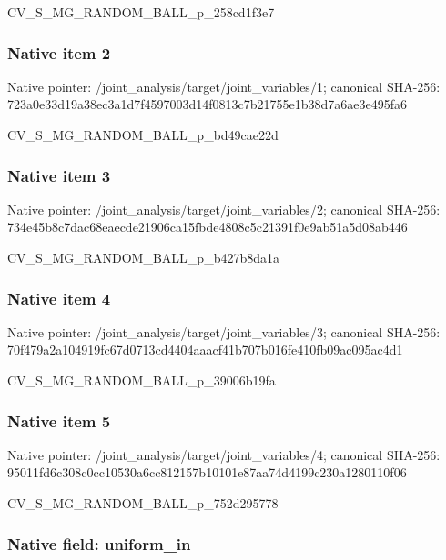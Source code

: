 \documentclass[10pt,a4paper]{article}
\begin{document}
CV\_S\_MG\_RANDOM\_BALL\_p\_258cd1f3e7


\subsubsection{Native item 2}


Native pointer: /joint\_analysis/target/j\allowbreak{}oint\_variables/1; canonical SHA-256: 723a0e33d19a38ec3a1d7f45\allowbreak{}97003d14f0813c7b21755e1b\allowbreak{}38d7a6ae3e495fa6


CV\_S\_MG\_RANDOM\_BALL\_p\_bd49cae22d


\subsubsection{Native item 3}


Native pointer: /joint\_analysis/target/j\allowbreak{}oint\_variables/2; canonical SHA-256: 734e45b8c7dac68eaecde219\allowbreak{}06ca15fbde4808c5c21391f0\allowbreak{}e9ab51a5d08ab446


CV\_S\_MG\_RANDOM\_BALL\_p\_b427b8da1a


\subsubsection{Native item 4}


Native pointer: /joint\_analysis/target/j\allowbreak{}oint\_variables/3; canonical SHA-256: 70f479a2a104919fc67d0713\allowbreak{}cd4404aaacf41b707b016fe4\allowbreak{}10fb09ac095ac4d1


CV\_S\_MG\_RANDOM\_BALL\_p\_39006b19fa


\subsubsection{Native item 5}


Native pointer: /joint\_analysis/target/j\allowbreak{}oint\_variables/4; canonical SHA-256: 95011fd6c308c0cc10530a6c\allowbreak{}c812157b10101e87aa74d419\allowbreak{}9c230a1280110f06


CV\_S\_MG\_RANDOM\_BALL\_p\_752d295778


\subsubsection{Native field: uniform\_in}
\end{document}
